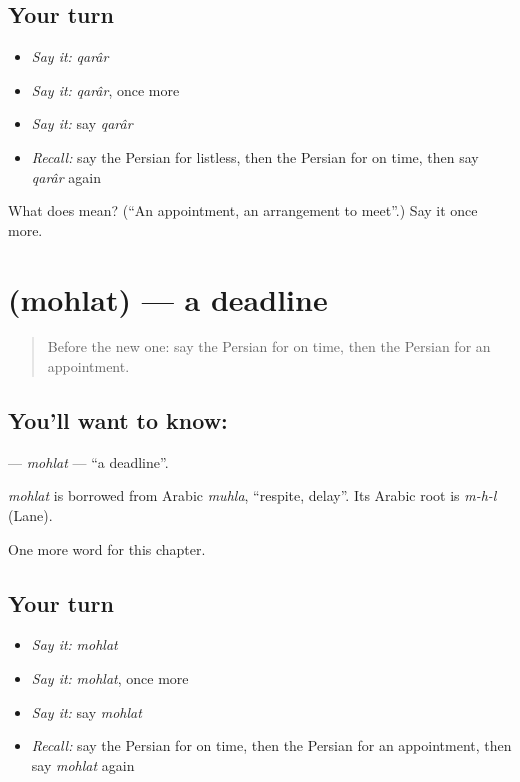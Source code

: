 \subsection*{Your turn}
\begin{itemize}
\raggedright
  \item \emph{Say it:} \emph{qarâr}
  \item \emph{Say it:} \emph{qarâr}, once more
  \item \emph{Say it:} say \emph{qarâr}
  \item \emph{Recall:} say the Persian for listless, then the Persian for on time, then say \emph{qarâr} again
\end{itemize}

\begin{tcolorbox}[breakable,colback=teal!4,colframe=teal!35!black,title={Before you move on}]
What does  mean? (\textquotedblleft{}An appointment, an arrangement to meet\textquotedblright{}.) Say it once more.
\end{tcolorbox}
\section[\texorpdfstring{\fa{مهلت} (mohlat)}{مهلت (mohlat)}]{ (mohlat) — a deadline}

\label{lesson:FA-C191-mohlat}



\begin{quote}
Before the new one: say the Persian for on time, then the Persian for an appointment.
\end{quote}

\subsection*{You'll want to know: }
\textbf{} — \emph{mohlat} — \textquotedblleft{}a deadline\textquotedblright{}.

\begin{cousinweb}
\emph{mohlat} is borrowed from Arabic \emph{muhla}, \textquotedblleft{}respite, delay\textquotedblright{}. Its Arabic root is \emph{m-h-l} (Lane).
\end{cousinweb}

\begin{grammarlens}[title={What you've built}]
One more word for this chapter.
\end{grammarlens}

\subsection*{Your turn}
\begin{itemize}
\raggedright
  \item \emph{Say it:} \emph{mohlat}
  \item \emph{Say it:} \emph{mohlat}, once more
  \item \emph{Say it:} say \emph{mohlat}
  \item \emph{Recall:} say the Persian for on time, then the Persian for an appointment, then say \emph{mohlat} again
\end{itemize}

